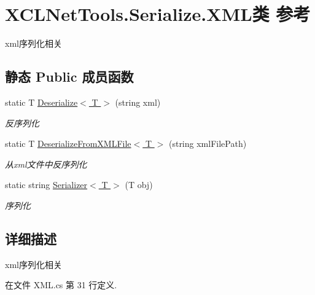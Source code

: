 \hypertarget{class_x_c_l_net_tools_1_1_serialize_1_1_x_m_l}{\section{X\-C\-L\-Net\-Tools.\-Serialize.\-X\-M\-L类 参考}
\label{class_x_c_l_net_tools_1_1_serialize_1_1_x_m_l}
}


xml序列化相关  


\subsection*{静态 Public 成员函数}
\begin{DoxyCompactItemize}
\item 
static T \hyperlink{class_x_c_l_net_tools_1_1_serialize_1_1_x_m_l_a10f494104b432660b2cbfbd686425ff9}{Deserialize$<$ T $>$} (string xml)
\begin{DoxyCompactList}\small\item\em 反序列化 \end{DoxyCompactList}\item 
static T \hyperlink{class_x_c_l_net_tools_1_1_serialize_1_1_x_m_l_afdebd810bc96d095cab8ccdf8aaca684}{Deserialize\-From\-X\-M\-L\-File$<$ T $>$} (string xml\-File\-Path)
\begin{DoxyCompactList}\small\item\em 从xml文件中反序列化 \end{DoxyCompactList}\item 
static string \hyperlink{class_x_c_l_net_tools_1_1_serialize_1_1_x_m_l_a9540436b849eff236f8353cad8b20658}{Serializer$<$ T $>$} (T obj)
\begin{DoxyCompactList}\small\item\em 序列化 \end{DoxyCompactList}\end{DoxyCompactItemize}


\subsection{详细描述}
xml序列化相关 



在文件 X\-M\-L.\-cs 第 31 行定义.



